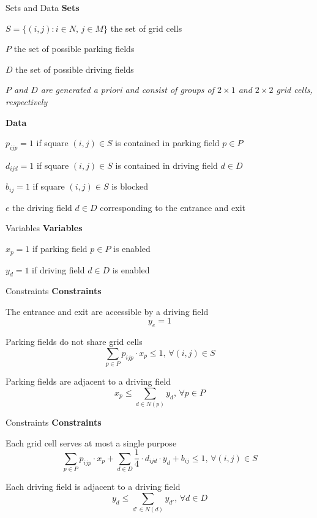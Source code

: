 \documentclass{beamer}
\begin{document}
\begin{frame}{Sets and Data}
\textbf{Sets}

$S = \{(i,j): i \in N,\, j \in M\}$ the set of grid cells\medskip

$P$ the set of possible parking fields\medskip

$D$ the set of possible driving fields\medskip

\textit{$P$ and $D$ are generated a priori and consist of groups of $2 \times 1$ and $2 \times 2$ grid cells, respectively}

\medskip
\textbf{Data}

$p_{ijp} = 1$ if square $(i,j) \in S$ is contained in parking field $p \in P$\medskip

$d_{ijd} = 1$ if square $(i,j) \in S$ is contained in driving field $d \in D$\medskip

$b_{ij} = 1$ if square $(i,j) \in S$ is blocked\medskip

$e$ the driving field $d\in D$ corresponding to the entrance and exit
\end{frame}

\begin{frame}{Variables}
\textbf{Variables}\medskip

$x_p = 1$ if parking field $p\in P$ is enabled\medskip

$y_d = 1$ if driving field $d \in D$ is enabled
    
\end{frame}

\begin{frame}{Constraints}
\textbf{Constraints}\medskip

The entrance and exit are accessible by a driving field
$$y_e = 1$$\medskip

Parking fields do not share grid cells
$$\sum_{p \in P} p_{ijp}\cdot x_p \leq 1,\, \forall(i,j) \in S$$\medskip

Parking fields are adjacent to a driving field
$$x_p \leq \sum_{d \in N(p)} y_d, \, \forall p\in P$$
\end{frame}

\begin{frame}{Constraints}
\textbf{Constraints}\medskip

Each grid cell serves at most a single purpose
$$\sum_{p \in P} p_{ijp} \cdot x_p + \sum_{d \in D} \frac{1}{4} \cdot d_{ijd} \cdot y_d + b_{ij} \leq 1,\, \forall(i,j) \in S$$\medskip

Each driving field is adjacent to a driving field
$$y_d \leq \sum_{d' \in N(d)} y_{d'},\, \forall d \in D$$
\end{frame}
\end{document}
